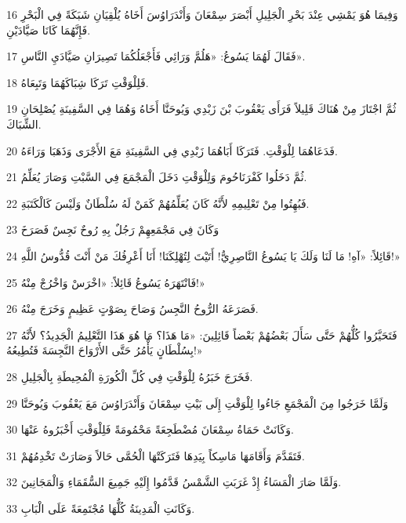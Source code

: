 \par 16 وَفِيمَا هُوَ يَمْشِي عِنْدَ بَحْرِ الْجَلِيلِ أَبْصَرَ سِمْعَانَ وَأَنْدَرَاوُسَ أَخَاهُ يُلْقِيَانِ شَبَكَةً فِي الْبَحْرِ فَإِنَّهُمَا كَانَا صَيَّادَيْنِ.
\par 17 فَقَالَ لَهُمَا يَسُوعُ: «هَلُمَّ وَرَائِي فَأَجْعَلُكُمَا تَصِيرَانِ صَيَّادَيِ النَّاسِ».
\par 18 فَلِلْوَقْتِ تَرَكَا شِبَاكَهُمَا وَتَبِعَاهُ.
\par 19 ثُمَّ اجْتَازَ مِنْ هُنَاكَ قَلِيلاً فَرَأَى يَعْقُوبَ بْنَ زَبْدِي وَيُوحَنَّا أَخَاهُ وَهُمَا فِي السَّفِينَةِ يُصْلِحَانِ الشِّبَاكَ.
\par 20 فَدَعَاهُمَا لِلْوَقْتِ. فَتَرَكَا أَبَاهُمَا زَبْدِي فِي السَّفِينَةِ مَعَ الأَجْرَى وَذَهَبَا وَرَاءَهُ.
\par 21 ثُمَّ دَخَلُوا كَفْرَنَاحُومَ وَلِلْوَقْتِ دَخَلَ الْمَجْمَعَ فِي السَّبْتِ وَصَارَ يُعَلِّمُ.
\par 22 فَبُهِتُوا مِنْ تَعْلِيمِهِ لأَنَّهُ كَانَ يُعَلِّمُهُمْ كَمَنْ لَهُ سُلْطَانٌ وَلَيْسَ كَالْكَتَبَةِ.
\par 23 وَكَانَ فِي مَجْمَعِهِمْ رَجُلٌ بِهِ رُوحٌ نَجِسٌ فَصَرَخَ
\par 24 قَائِلاً: «آهِ! مَا لَنَا وَلَكَ يَا يَسُوعُ النَّاصِرِيُّ! أَتَيْتَ لِتُهْلِكَنَا! أَنَا أَعْرِفُكَ مَنْ أَنْتَ قُدُّوسُ اللَّهِ!»
\par 25 فَانْتَهَرَهُ يَسُوعُ قَائِلاً: «اخْرَسْ وَاخْرُجْ مِنْهُ!»
\par 26 فَصَرَعَهُ الرُّوحُ النَّجِسُ وَصَاحَ بِصَوْتٍ عَظِيمٍ وَخَرَجَ مِنْهُ.
\par 27 فَتَحَيَّرُوا كُلُّهُمْ حَتَّى سَأَلَ بَعْضُهُمْ بَعْضاً قَائِلِينَ: «مَا هَذَا؟ مَا هُوَ هَذَا التَّعْلِيمُ الْجَدِيدُ؟ لأَنَّهُ بِسُلْطَانٍ يَأْمُرُ حَتَّى الأَرْوَاحَ النَّجِسَةَ فَتُطِيعُهُ!»
\par 28 فَخَرَجَ خَبَرُهُ لِلْوَقْتِ فِي كُلِّ الْكُورَةِ الْمُحِيطَةِ بِالْجَلِيلِ.
\par 29 وَلَمَّا خَرَجُوا مِنَ الْمَجْمَعِ جَاءُوا لِلْوَقْتِ إِلَى بَيْتِ سِمْعَانَ وَأَنْدَرَاوُسَ مَعَ يَعْقُوبَ وَيُوحَنَّا
\par 30 وَكَانَتْ حَمَاةُ سِمْعَانَ مُضْطَجِعَةً مَحْمُومَةً فَلِلْوَقْتِ أَخْبَرُوهُ عَنْهَا.
\par 31 فَتَقَدَّمَ وَأَقَامَهَا مَاسِكاً بِيَدِهَا فَتَرَكَتْهَا الْحُمَّى حَالاً وَصَارَتْ تَخْدِمُهُمْ.
\par 32 وَلَمَّا صَارَ الْمَسَاءُ إِذْ غَرَبَتِ الشَّمْسُ قَدَّمُوا إِلَيْهِ جَمِيعَ السُّقَمَاءِ وَالْمَجَانِينَ.
\par 33 وَكَانَتِ الْمَدِينَةُ كُلُّهَا مُجْتَمِعَةً عَلَى الْبَابِ.
